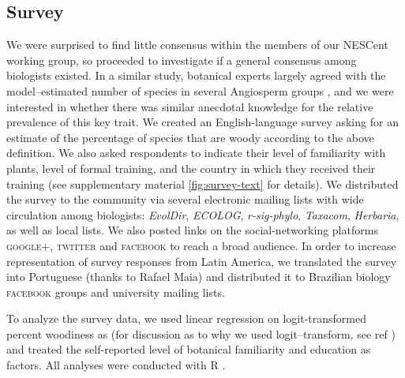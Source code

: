 \documentclass[12pt]{article}
\begin{document}
\subsection{Survey}

% 
%
We were surprised to find little consensus within the members of our
NESCent working group, so proceeded to investigate if a general
consensus among biologists existed.
% 
In a similar study, botanical experts largely agreed with the
model--estimated number of species in several Angiosperm groups
\citep{joppa2010}, and we were interested in whether there was similar
anecdotal knowledge for the relative prevalence of this key trait.
%
We created an English-language survey asking for an estimate of the
percentage of species that are woody according to the above definition.  We also asked respondents to
indicate their level of familiarity with plants, level of formal
training, and the country in which they received their training (see
supplementary material \ref{fig:survey-text} for details).
%
We distributed the survey to the community via several electronic
mailing lists with wide circulation among biologists: \emph{EvolDir},
\emph{ECOLOG}, \emph{r-sig-phylo}, \emph{Taxacom}, \emph{Herbaria}, as
well as local lists. We also posted links on the social-networking
platforms \textsc{google+}, \textsc{twitter} and \textsc{facebook} to
reach a broad audience.
%
In order to increase representation of survey responses from Latin
America, we translated the survey into Portuguese (thanks to Rafael
Maia) and distributed it to Brazilian biology
\textsc{facebook} groups and university mailing lists.

To analyze the survey data, we used linear regression on
logit-transformed percent woodiness as (for discussion as to why we
used logit--transform, see ref \citep{wartonarcsine}) and treated the
self-reported level of botanical familiarity and education as factors.
All analyses were conducted with R \citep{R}.
\end{document}
